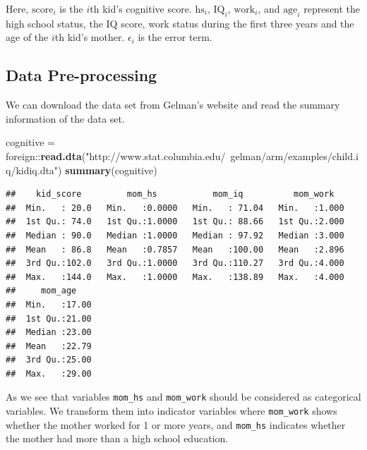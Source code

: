\documentclass[]{book}
\newenvironment{Shaded}{\begin{snugshade}}{\end{snugshade}}
\newcommand{\KeywordTok}[1]{\textcolor[rgb]{0.13,0.29,0.53}{\textbf{{#1}}}}
\newcommand{\DecValTok}[1]{\textcolor[rgb]{0.00,0.00,0.81}{{#1}}}
\newcommand{\StringTok}[1]{\textcolor[rgb]{0.31,0.60,0.02}{{#1}}}
\newcommand{\CommentTok}[1]{\textcolor[rgb]{0.56,0.35,0.01}{\textit{{#1}}}}
\newcommand{\NormalTok}[1]{{#1}}
\theoremstyle{definition}
\theoremstyle{definition}
\theoremstyle{definition}
\theoremstyle{remark}
\begin{document}
Here, \(\text{score}_i\) is the \(i\)th kid's cognitive score.
\(\text{hs}_i\), \(\text{IQ}_i\), \(\text{work}_i\), and
\(\text{age}_i\) represent the high school status, the IQ score, work
status during the first three years and the age of the \(i\)th kid's
mother. \(\epsilon_i\) is the error term.

\subsection{Data Pre-processing}\label{data-pre-processing}

We can download the data set from Gelman's website and read the summary
information of the data set.

\begin{Shaded}
\begin{Highlighting}[]
\NormalTok{cognitive =}\StringTok{ }\NormalTok{foreign::}\KeywordTok{read.dta}\NormalTok{(}\StringTok{"http://www.stat.columbia.edu/~gelman/arm/examples/child.iq/kidiq.dta"}\NormalTok{)}
\KeywordTok{summary}\NormalTok{(cognitive)}
\end{Highlighting}
\end{Shaded}

\begin{verbatim}
##    kid_score         mom_hs           mom_iq          mom_work    
##  Min.   : 20.0   Min.   :0.0000   Min.   : 71.04   Min.   :1.000  
##  1st Qu.: 74.0   1st Qu.:1.0000   1st Qu.: 88.66   1st Qu.:2.000  
##  Median : 90.0   Median :1.0000   Median : 97.92   Median :3.000  
##  Mean   : 86.8   Mean   :0.7857   Mean   :100.00   Mean   :2.896  
##  3rd Qu.:102.0   3rd Qu.:1.0000   3rd Qu.:110.27   3rd Qu.:4.000  
##  Max.   :144.0   Max.   :1.0000   Max.   :138.89   Max.   :4.000  
##     mom_age     
##  Min.   :17.00  
##  1st Qu.:21.00  
##  Median :23.00  
##  Mean   :22.79  
##  3rd Qu.:25.00  
##  Max.   :29.00
\end{verbatim}

As we see that variables \texttt{mom\_hs} and \texttt{mom\_work} should
be considered as categorical variables. We transform them into indicator
variables where \texttt{mom\_work} shows whether the mother worked for 1
or more years, and \texttt{mom\_hs} indicates whether the mother had
more than a high school education.

\begin{Shaded}
\end{Shaded}
\end{document}

